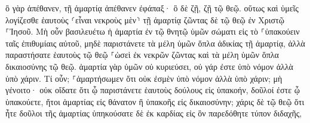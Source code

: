 \documentclass{openreader}
\begin{document}
ὃ γὰρ ἀπέθανεν, τῇ ἁμαρτίᾳ ἀπέθανεν ἐφάπαξ· ὃ δὲ ζῇ, ζῇ τῷ θεῷ. 
οὕτως καὶ ὑμεῖς λογίζεσθε ἑαυτοὺς ⸂εἶναι νεκροὺς μὲν⸃ τῇ ἁμαρτίᾳ ζῶντας δὲ τῷ θεῷ ἐν Χριστῷ ⸀Ἰησοῦ. 
Μὴ οὖν βασιλευέτω ἡ ἁμαρτία ἐν τῷ θνητῷ ὑμῶν σώματι εἰς τὸ ⸀ὑπακούειν ταῖς ἐπιθυμίαις αὐτοῦ, 
μηδὲ παριστάνετε τὰ μέλη ὑμῶν ὅπλα ἀδικίας τῇ ἁμαρτίᾳ, ἀλλὰ παραστήσατε ἑαυτοὺς τῷ θεῷ ⸀ὡσεὶ ἐκ νεκρῶν ζῶντας καὶ τὰ μέλη ὑμῶν ὅπλα δικαιοσύνης τῷ θεῷ. 
ἁμαρτία γὰρ ὑμῶν οὐ κυριεύσει, οὐ γάρ ἐστε ὑπὸ νόμον ἀλλὰ ὑπὸ χάριν. 
Τί οὖν; ⸀ἁμαρτήσωμεν ὅτι οὐκ ἐσμὲν ὑπὸ νόμον ἀλλὰ ὑπὸ χάριν; μὴ γένοιτο· 
οὐκ οἴδατε ὅτι ᾧ παριστάνετε ἑαυτοὺς δούλους εἰς ὑπακοήν, δοῦλοί ἐστε ᾧ ὑπακούετε, ἤτοι ἁμαρτίας εἰς θάνατον ἢ ὑπακοῆς εἰς δικαιοσύνην; 
χάρις δὲ τῷ θεῷ ὅτι ἦτε δοῦλοι τῆς ἁμαρτίας ὑπηκούσατε δὲ ἐκ καρδίας εἰς ὃν παρεδόθητε τύπον διδαχῆς, 
\end{document}
